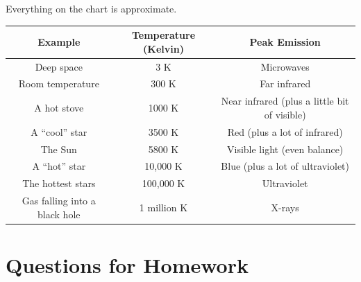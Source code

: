 \documentclass[12pt]{article}
\begin{document}
Everything on the chart is approximate. 

\begin{tabular}{|c|c|c|}
	\hline
	\bf Example & \bf Temperature (Kelvin) & \bf Peak Emission \\ \hline
	Deep space & 3 K & Microwaves \\ \hline
	Room temperature & 300 K & Far infrared \\ \hline
	A hot stove & 1000 K & Near infrared (plus a little bit of visible) \\ \hline
	A ``cool'' star & 3500 K & Red (plus a lot of infrared)\\ \hline
	The Sun & 5800 K & Visible light (even balance) \\ \hline
	A ``hot'' star & 10,000 K & Blue (plus a lot of ultraviolet) \\ \hline
	The hottest stars & 100,000 K & Ultraviolet \\ \hline
	Gas falling into a black hole & 1 million K & X-rays \\ \hline
\end{tabular}


\section{Questions for Homework}
\end{document}
